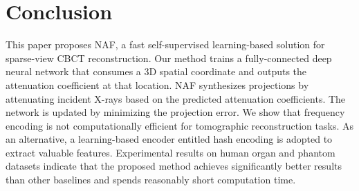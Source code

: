 \documentclass[runningheads]{llncs}
\begin{document}
\section{Conclusion}
This paper proposes NAF, a fast self-supervised learning-based solution for sparse-view CBCT reconstruction. Our method trains a fully-connected deep neural network that consumes a 3D spatial coordinate and outputs the attenuation coefficient at that location. NAF synthesizes projections by attenuating incident X-rays based on the predicted attenuation coefficients. The network is updated by minimizing the projection error. We show that frequency encoding is not computationally efficient for tomographic reconstruction tasks. As an alternative, a learning-based encoder entitled hash encoding is adopted to extract valuable features. Experimental results on human organ and phantom datasets indicate that the proposed method achieves significantly better results than other baselines and spends reasonably short computation time.












\end{document}
